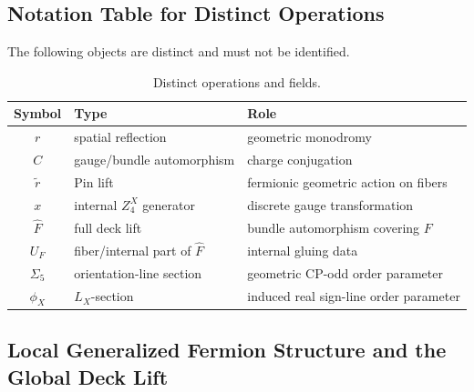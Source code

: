 \documentclass[11pt]{article}
\theoremstyle{canonmath}
\theoremstyle{canonpostulate}
\theoremstyle{canonclaim}
\def\mathbb#1{#1}%
\begin{document}
\subsection{Notation Table for Distinct Operations}

The following objects are distinct and must not be identified.

\begin{table}[H]
\centering
\caption{Distinct operations and fields.}
\begin{tabular}{@{}cll@{}}
\toprule
\textbf{Symbol} & \textbf{Type} & \textbf{Role} \\
\midrule
$r$ & spatial reflection & geometric monodromy \\
$C$ & gauge/bundle automorphism & charge conjugation \\
$\widetilde r$ & Pin lift & fermionic geometric action on fibers \\
$x$ & internal $\mathbb Z_4^X$ generator & discrete gauge transformation \\
$\widehat F$ & full deck lift & bundle automorphism covering $F$ \\
$U_F$ & fiber/internal part of $\widehat F$ & internal gluing data \\
$\Sigma_5$ & orientation-line section & geometric CP-odd order parameter \\
$\phi_X$ & $L_X$-section & induced real sign-line order parameter \\
\bottomrule
\end{tabular}
\end{table}

\subsection{Local Generalized Fermion Structure and the Global Deck Lift}
\end{document}

